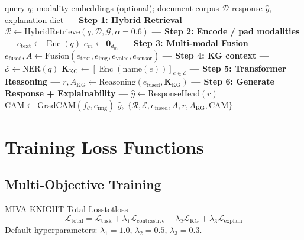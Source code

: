 \documentclass[12pt,a4paper]{article}
\newcommand{\kg}{\mathcal{G}}
\newcommand{\Enc}{\operatorname{Enc}}
\newcommand{\efused}{e_{\text{fused}}}
\begin{document}
\begin{algorithm}[H]
\caption{MIVA-KNIGHT End-to-End Inference}
\label{alg:e2e}
\begin{algorithmic}[1]
\Require query $q$; modality embeddings (optional); document corpus $\mathcal{D}$
\Ensure response $\hat{y}$, explanation dict
\State \textbf{--- Step 1: Hybrid Retrieval ---}
\State $\mathcal{R} \leftarrow \text{HybridRetrieve}(q, \mathcal{D}, \kg, \alpha=0.6)$
\State
\State \textbf{--- Step 2: Encode / pad modalities ---}
  $e_\text{text} \leftarrow \Enc(q)$
\EndIf
{}
  \State $e_m \leftarrow \mathbf{0}_{d_m}$
\EndFor
\State
\State \textbf{--- Step 3: Multi-modal Fusion ---}
\State $\efused, A \leftarrow \text{Fusion}(e_\text{text}, e_\text{img}, e_\text{voice}, e_\text{sensor})$
\State
\State \textbf{--- Step 4: KG context ---}
\State $\mathcal{E} \leftarrow \text{NER}(q)$
\State $\mathbf{K}_\text{KG} \leftarrow
       [\Enc(\text{name}(e))]_{e \in \mathcal{E}}$
\State
\State \textbf{--- Step 5: Transformer Reasoning ---}
\State $r, A_\text{KG} \leftarrow \text{Reasoning}(\efused, \mathbf{K}_\text{KG})$
\State
\State \textbf{--- Step 6: Generate Response + Explainability ---}
\State $\hat{y} \leftarrow \text{ResponseHead}(r)$
\State $\text{CAM} \leftarrow \text{GradCAM}(f_\theta, e_\text{img})$
\State
\State \Return $\hat{y},\;\{\mathcal{R}, \mathcal{E}, \efused, A, r, A_\text{KG}, \text{CAM}\}$
\end{algorithmic}
\end{algorithm}

\section{Training Loss Functions}

\subsection{Multi-Objective Training}

\begin{definition}{MIVA-KNIGHT Total Loss}{totloss}
\[
  \boxed{\mathcal{L}_\text{total}
  = \mathcal{L}_\text{task}
  + \lambda_1 \mathcal{L}_\text{contrastive}
  + \lambda_2 \mathcal{L}_\text{KG}
  + \lambda_3 \mathcal{L}_\text{explain}}
\]
Default hyperparameters: $\lambda_1=1.0$, $\lambda_2=0.5$, $\lambda_3=0.3$.
\end{definition}
\end{document}
